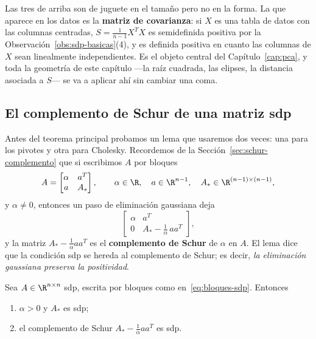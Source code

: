 \begin{remark}\label{obs:donde-aparecen}
Las tres de arriba son de juguete en el tamaño pero no en la forma. La que
aparece en los datos es la \textbf{matriz de covarianza}: si $X$ es una tabla
de datos con las columnas centradas, $S=\frac1{n-1}X^TX$ es semidefinida
positiva por la Observación~\ref{obs:sdp-basicas}(4), y es definida positiva
en cuanto las columnas de $X$ sean linealmente independientes. Es el objeto
central del Capítulo~\ref{cap:pca}, y toda la geometría de este capítulo
---la raíz cuadrada, las elipses, la distancia asociada a $S$--- se va a
aplicar ahí sin cambiar una coma.
\end{remark}

\subsection{El complemento de Schur de una matriz sdp}
\label{sec:schur-sdp}

Antes del teorema principal probamos un lema que usaremos dos veces: una para
los pivotes y otra para Cholesky. Recordemos de la
Sección~\ref{sec:schur-complemento} que si escribimos $A$ por bloques
\begin{equation}\label{eq:bloques-sdp}
A = \begin{bmatrix} \alpha & a^T \\ a & A_*\end{bmatrix},
\qquad \alpha\in\R,\quad a\in\R^{n-1},\quad A_*\in\R^{(n-1)\times(n-1)},
\end{equation}
y $\alpha\neq0$, entonces un paso de eliminación gaussiana deja
\[
\begin{bmatrix} \alpha & a^T \\ 0 & A_* - \tfrac1\alpha\, a a^T\end{bmatrix} ,
\]
y la matriz $A_* - \frac1\alpha a a^T$ es el \textbf{complemento de Schur} de
$\alpha$ en $A$. El lema dice que la condición sdp se hereda al complemento de
Schur; es decir, \emph{la eliminación gaussiana preserva la positividad}.

\begin{lemma}\label{lema:schur-sdp}
Sea $A\in\R^{n\times n}$ sdp, escrita por bloques como
en~\eqref{eq:bloques-sdp}. Entonces
\begin{enumerate}[label=\textbf{(\alph*)},itemsep=2pt,topsep=3pt]
\item $\alpha>0$ y $A_*$ es sdp;
\item el complemento de Schur $A_*-\frac1\alpha aa^T$ es sdp.
\end{enumerate}
\end{lemma}

